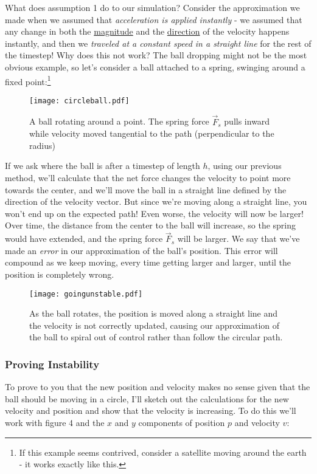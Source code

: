 \documentclass[]{article}
\begin{document}
What does assumption 1 do to our simulation? Consider the approximation we made when we assumed that \emph{acceleration is applied instantly} - we assumed that any change in both the \underline{magnitude} and the \underline{direction} of the velocity happens instantly, and then we \emph{traveled at a constant speed in a straight line} for the rest of the timestep! Why does this not work? The ball dropping might not be the most obvious example, so let's consider a ball attached to a spring, swinging around a fixed point:\footnote{If this example seems contrived, consider a satellite moving around the earth - it works exactly like this.}
\begin{figure}[htp]
    \centering
    \texttt{[image: circleball.pdf]}
	\label{circleballfig}
    \caption{A ball rotating around a point. The spring force $\vec{F}_s$ pulls inward while velocity moved tangential to the path (perpendicular to the radius)}
\end{figure}

If we ask where the ball is after a timestep of length $h$, using our previous method, we'll calculate that the net force changes the velocity to point more towards the center, and we'll move the ball in a straight line defined by the direction of the velocity vector. But since we're moving along a straight line, you won't end up on the expected path! Even worse, the velocity will now be larger! Over time, the distance from the center to the ball will increase, so the spring would have extended, and the spring force $\vec{F}_s$ will be larger. We say that we've made an \emph{error} in our approximation of the ball's position. This error will compound as we keep moving, every time getting larger and larger, until the position is completely wrong.
\begin{figure}[htp]
    \centering
    \texttt{[image: goingunstable.pdf]}
    \caption{As the ball rotates, the position is moved along a straight line and the velocity is not correctly updated, causing our approximation of the ball to spiral out of control rather than follow the circular path.}
\end{figure}

\pagebreak

\subsubsection{Proving Instability}

To prove to you that the new position and velocity makes no sense given that the ball should be moving in a circle, I'll sketch out the calculations for the new velocity and position and show that the velocity is increasing. To do this we'll work with figure 4 and the $x$ and $y$ components of position $p$ and velocity $v$:
\end{document}
